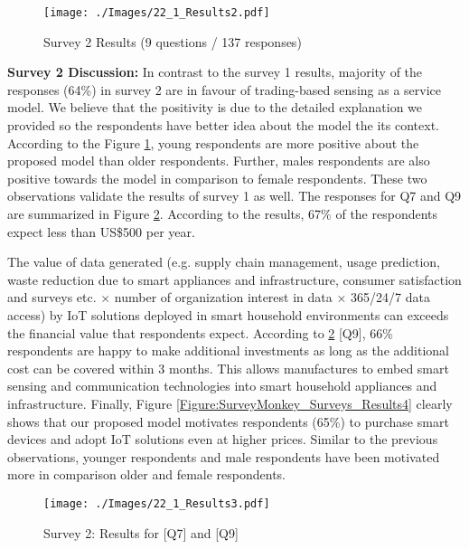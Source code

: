 \documentclass[conference]{IEEEtran}
\begin{document}
\begin{figure}[b]
 \centering
 \vspace{-0.43cm}
 \texttt{[image: ./Images/22\_1\_Results2.pdf]}
\caption{Survey 2 Results (9 questions / 137 responses)}
 \label{Figure:SurveyMonkey_Surveys_Results2}	
\vspace{-0.52cm}	
\end{figure}



\textbf{Survey 2 Discussion:} In contrast to the survey 1 results, majority of the responses (64\%) in survey 2 are in favour of trading-based sensing as a service model. We believe that the positivity is due to the detailed explanation we provided so the respondents have better idea about the model the its context. According to the Figure \ref{Figure:SurveyMonkey_Surveys_Results2},  young respondents are more positive about the proposed model than older respondents. Further, males respondents are also positive towards the model in comparison to female respondents. These two observations validate the results of survey 1 as well. The responses for Q7 and Q9 are summarized in Figure \ref{Figure:SurveyMonkey_Surveys_Results3}. According to the results, 67\% of the respondents expect less than US\$500 per year.


The value of data generated (e.g. supply chain management, usage prediction, waste reduction due to smart appliances and infrastructure, consumer satisfaction and surveys etc. $\times$ number of organization interest in data $\times$ 365/24/7 data access) by IoT solutions  deployed in smart household environments can exceeds the  financial value  that respondents expect. According to  \ref{Figure:SurveyMonkey_Surveys_Results3} [Q9], 66\% respondents are happy to make additional investments as long as the additional cost can be covered within 3 months. This allows manufactures to embed smart sensing and communication technologies into smart household appliances and infrastructure. Finally, Figure \ref{Figure:SurveyMonkey_Surveys_Results4} clearly shows that our proposed model motivates respondents (65\%) to purchase smart devices and adopt IoT solutions even at higher prices. Similar to the previous observations, younger respondents and male respondents have been motivated more in comparison older and female respondents.


\begin{figure}[t]
 \centering
\texttt{[image: ./Images/22\_1\_Results3.pdf]}
\caption{Survey 2: Results for [Q7] and [Q9]}
 \label{Figure:SurveyMonkey_Surveys_Results3}	
\vspace{-0.60cm}	
\end{figure}
\end{document}
